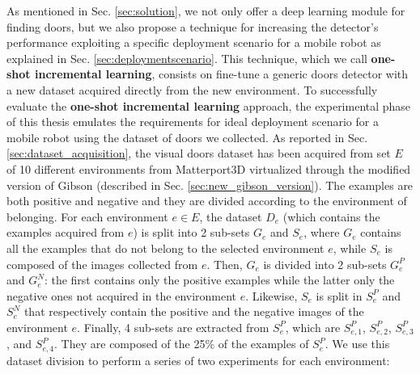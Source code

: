 As mentioned in Sec. \ref{sec:solution}, we not only offer a deep learning module for finding doors, but we also propose a technique for increasing the detector's performance exploiting a specific deployment scenario for a mobile robot as  explained in Sec. \ref{sec:deploymentscenario}. This technique, which we call \textbf{one-shot incremental learning}, consists on fine-tune a generic doors detector with a new dataset acquired directly from the new environment.
To successfully evaluate the \textbf{one-shot incremental learning} approach, the experimental phase of this thesis emulates the requirements for ideal deployment scenario for a mobile robot using the dataset of doors we collected. As reported in Sec. \ref{sec:dataset_acquisition}, the visual doors dataset has been acquired from set $E$ of 10 different environments from Matterport3D \cite{matterport} virtualized through the modified version of Gibson \cite{gibson} (described in Sec. \ref{sec:new_gibson_version}). The examples are both positive and negative and they are divided according to the environment of belonging. For each environment $e \in E$, the dataset $D_{e}$ (which contains the examples acquired from $e$) is split into 2 sub-sets $G_e$ and $S_e$, where $G_e$ contains all the examples that do not belong to the selected environment $e$, while $S_e$ is composed of the images collected from $e$. Then, $G_e$ is divided into 2 sub-sets $G^{P}_e$ and $G^{N}_e$: the first contains only the positive examples while the latter only the negative ones not acquired in the environment $e$. Likewise, $S_e$ is split in $S^{P}_e$ and $S^{N}_e$ that respectively contain the positive and the negative images of the environment $e$. Finally, 4 sub-sets are extracted from $S^{P}_e$, which are $S^{P}_{e, 1}$, $S^{P}_{e, 2}$, $S^{P}_{e, 3}$, and $S^{P}_{e, 4} $. They are composed of the 25\% of the examples of $S^{P}_e$. We use this dataset division to perform a series of two experiments for each environment:

